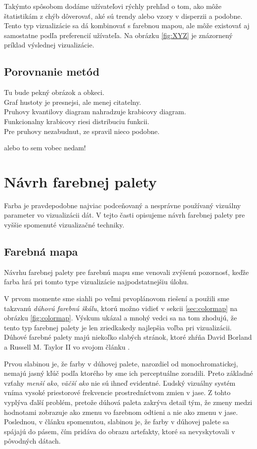 Takýmto spôsobom dodáme užívateľovi rýchly prehľad o tom, ako môže štatistikám z chýb dôverovať, aké sú trendy alebo vzory v disperzii a podobne. Tento typ vizualizácie sa dá kombinovať s farebnou mapou, ale môže existovať aj samostatne podľa preferencií užívateľa. Na obrázku \ref{fig:XYZ} je znázornený príklad výslednej vizualizácie.


\subsection{Porovnanie metód}

Tu bude pekný obrázok a obkeci. \\
Graf hustoty je presnejsi, ale menej citatelny. \\
Pruhovy kvantilovy diagram nahradzuje krabicovy diagram. \\
Funkcionalny krabicovy riesi distribuciu funkcii. \\

Pre pruhovy nezabudnut, ze \cite{Bade} spravil nieco podobne.

alebo to sem vobec nedam! 

\section{Návrh farebnej palety}
Farba je pravdepodobne najviac podceňovaný a nesprávne používaný vizuálny parameter vo vizualizácii dát. V tejto časti opisujeme návrh farebnej palety pre vyššie spomenuté vizualizačné techniky.

\subsection{Farebná mapa}
Návrhu farebnej palety pre farebnú mapu sme venovali zvýšenú pozornosť, keďže farba hrá pri tomto type vizualizácie najpodstatnejšiu úlohu.

V prvom momente sme siahli po veľmi prvoplánovom riešení a použili sme takzvanú \textit{dúhovú farebnú škálu}, ktorú možno vidieť v sekcii \ref{sec:colormap} na obrázku \ref{fig:colormap}. Výskum ukázal a mnohý vedci sa na tom zhodujú, že tento typ farebnej palety je len zriedkakedy najlepšia voľba pri vizualizácii. Dúhové farebné palety majú niekoľko slabých stránok, ktoré zhŕňa David Borland a Russell M. Taylor II vo svojom článku \cite{RainbowHarmful}.

Prvou slabinou je, že farby v dúhovej palete, narozdiel od monochromatickej, nemajú jasný kľúč podľa ktorého by sme ich perceptuálne zoradili. Preto základné vzťahy \textit{menší ako}, \textit{väčší ako} nie sú ihneď evidentné. Ľudský vizuálny systém vníma vysoké priestorové frekvencie prostredníctvom zmien v jase. Z tohto vyplýva ďalší problém, pretože dúhová paleta zakrýva detail tým, že zmeny medzi hodnotami zobrazuje ako zmenu vo farebnom odtieni a nie ako zmenu v jase. Poslednou, v článku spomenutou, slabinou je, že farby v dúhovej palete sa spájajú do pásem, čím pridáva do obrazu artefakty, ktoré sa nevyskytovali v pôvodných dátach. 

